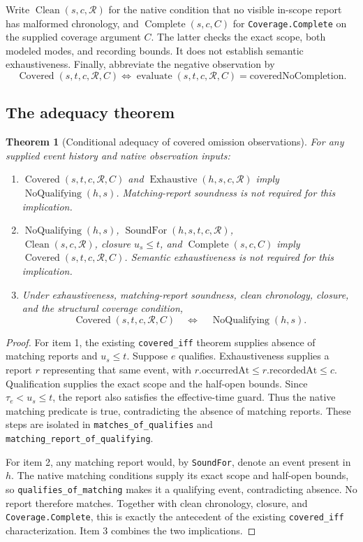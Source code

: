 \documentclass[11pt]{article}
\newtheorem{theorem}{Theorem}
\newcommand{\op}[1]{\operatorname{#1}}
\begin{document}
Write \(\op{Clean}(s,c,\mathcal R)\) for the native condition that no visible in-scope report has malformed chronology, and \(\op{Complete}(s,c,C)\) for \texttt{Coverage.Complete} on the supplied coverage argument \(C\). The latter checks the exact scope, both modeled modes, and recording bounds. It does not establish semantic exhaustiveness. Finally, abbreviate the negative observation by
\[
 \op{Covered}(s,t,c,\mathcal R,C)\iff
 \op{evaluate}(s,t,c,\mathcal R,C)=\mathrm{coveredNoCompletion}.
\]

\subsection{The adequacy theorem}

\begin{theorem}[Conditional adequacy of covered omission observations]\label{thm:omission-adequacy}
For any supplied event history and native observation inputs:
\begin{enumerate}
\item \(\op{Covered}(s,t,c,\mathcal R,C)\) and
\(\op{Exhaustive}(h,s,c,\mathcal R)\) imply
\(\op{NoQualifying}(h,s)\). Matching-report soundness is not required for this implication.
\item \(\op{NoQualifying}(h,s)\),
\(\op{SoundFor}(h,s,t,c,\mathcal R)\),\\
\(\op{Clean}(s,c,\mathcal R)\), closure \(u_s\le t\), and
\(\op{Complete}(s,c,C)\) imply
\(\op{Covered}(s,t,c,\mathcal R,C)\). Semantic exhaustiveness is not required for this implication.
\item Under exhaustiveness, matching-report soundness, clean chronology, closure, and the structural coverage condition,
\[
 \op{Covered}(s,t,c,\mathcal R,C)
 \quad\Longleftrightarrow\quad
 \op{NoQualifying}(h,s).
\]
\end{enumerate}
\end{theorem}

\begin{proof}
For item 1, the existing \texttt{covered\_iff} theorem supplies absence of matching reports and \(u_s\le t\). Suppose \(e\) qualifies. Exhaustiveness supplies a report \(r\) representing that same event, with \(r.\mathrm{occurredAt}\le r.\mathrm{recordedAt}\le c\). Qualification supplies the exact scope and the half-open bounds. Since \(\tau_e<u_s\le t\), the report also satisfies the effective-time guard. Thus the native matching predicate is true, contradicting the absence of matching reports. These steps are isolated in \texttt{matches\_of\_qualifies} and \texttt{matching\_\allowbreak{}report\_\allowbreak{}of\_\allowbreak{}qualifying}.

For item 2, any matching report would, by \texttt{SoundFor}, denote an event present in \(h\). The native matching conditions supply its exact scope and half-open bounds, so \texttt{qualifies\_of\_matching} makes it a qualifying event, contradicting absence. No report therefore matches. Together with clean chronology, closure, and \texttt{Coverage.Complete}, this is exactly the antecedent of the existing \texttt{covered\_iff} characterization. Item 3 combines the two implications.
\end{proof}
\end{document}
